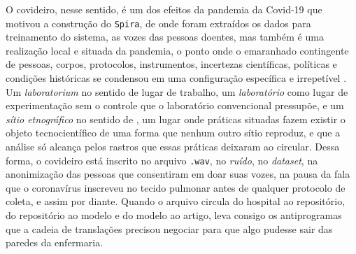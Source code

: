 O covideiro, nesse sentido, é um dos efeitos da pandemia da Covid-19 que motivou a construção do \texttt{Spira}, de onde foram extraídos os dados para treinamento do sistema, as vozes das pessoas doentes, mas também é uma realização local e situada da pandemia, o ponto onde o emaranhado contingente de pessoas, corpos, protocolos, instrumentos, incertezas científicas, políticas e condições históricas se condensou em uma configuração específica e irrepetível \parencite{Segata2021Covid}. Um \textit{laboratorium} no sentido de lugar de trabalho, um \textit{laboratório} como lugar de experimentação sem o controle que o laboratório convencional pressupõe, e um \textit{sítio etnográfico} no sentido de \textcite{mol2002body}, um lugar onde práticas situadas fazem existir o objeto tecnocientífico de uma forma que nenhum outro sítio reproduz, e que a análise só alcança pelos rastros que essas práticas deixaram ao circular. Dessa forma, o covideiro está inscrito no arquivo \texttt{.wav}, no \textit{ruído}, no \textit{dataset}, na anonimização das pessoas que consentiram em doar suas vozes, na pausa da fala que o coronavírus inscreveu no tecido pulmonar antes de qualquer protocolo de coleta, e assim por diante. Quando o arquivo circula do hospital ao repositório, do repositório ao modelo e do modelo ao artigo, leva consigo os antiprogramas que a cadeia de translações precisou negociar para que algo pudesse sair das paredes da enfermaria.

